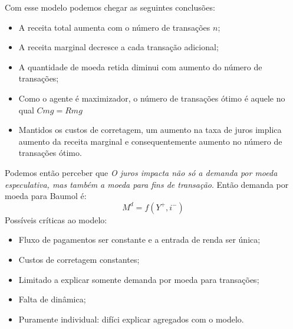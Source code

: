 \documentclass[12pt,a4paper,oneside,brazil]{abntex2}
\begin{document}
Com esse modelo podemos chegar as seguintes conclusões:
\begin{itemize}
\item A receita total aumenta com o número de transações $n$;
\item A receita marginal decresce a cada transação adicional;
\item A quantidade de moeda retida diminui com aumento do número de transações;
\item Como o agente é maximizador, o número de transações ótimo é aquele no qual $Cmg = Rmg$
\item Mantidos os custos de corretagem, um aumento na taxa de juros implica aumento da receita marginal e consequentemente aumento no número de transações ótimo.
\end{itemize}
Podemos então perceber que \emph{O juros impacta não só a demanda por moeda especulativa, mas também a moeda para fins de transação}. Então demanda por moeda para Baumol é:
\[ M^d = f(Y^+ , i^-) \]
Possíveis críticas ao modelo:
\begin{itemize}
\item Fluxo de pagamentos ser constante e a entrada de renda ser única;
\item Custos de corretagem constantes;
\item Limitado a explicar somente demanda por moeda para transações;
\item Falta de dinâmica;
\item Puramente individual: difíci explicar agregados com o modelo.
\end{itemize}
\end{document}
